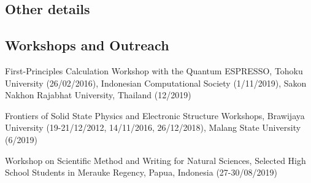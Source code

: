 \documentclass[a4paper,11pt]{article}
\renewenvironment{itemize}{
  \begin{list}{}{
      \setlength{\leftmargin}{1.5em}
      \setlength{\parskip}{0pt}
      \setlength{\parsep}{0pt}
      \setlength{\itemsep}{3pt}
  }
}{
  \end{list}
}
\begin{document}
\subsection{Other details}
\subsection*{Workshops and Outreach}
\begin{itemize}

\item   First-Principles Calculation Workshop with the Quantum ESPRESSO,  Tohoku University (26/02/2016), Indonesian Computational Society (1/11/2019), Sakon Nakhon Rajabhat University, Thailand (12/2019) 
\item Frontiers of Solid State Physics and Electronic Structure Workshops, Brawijaya University (19-21/12/2012, 14/11/2016, 26/12/2018), Malang State University (6/2019)
\item Workshop on Scientific Method and Writing for Natural Sciences, Selected High School Students in Merauke Regency, Papua, Indonesia (27-30/08/2019)
\end{itemize}
\end{document}

